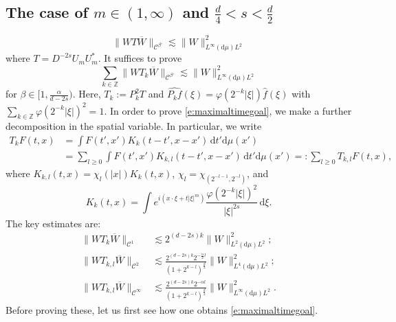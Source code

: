 \documentclass[a4paper]{amsart}
\numberwithin{equation}{section}%
\theoremstyle{plain}%
\theoremstyle{definition}
\theoremstyle{remark}%
\def\d{\mathrm{d}}
\def\C{\mathcal{C}}
\def\C{\mathcal{C}}
\begin{document}
\subsection*{The case of $m\in(1,\infty)$ and $\frac d4<s<\frac d2$}
\begin{equation}\label{e:goal maximal}
\|WT\overline{W}\|_{\C^{\beta'}}
\lesssim
\|W\|_{L^\infty(\d\mu)L^2}^2
\end{equation}
where $T=D^{-2s}U_mU_m^*$. It suffices to prove 
\begin{equation} \label{e:maximaltimegoal}
\sum_{k\in\mathbb Z} \|WT_k\overline{W} \|_{\C^{\beta'}}
\lesssim
\|W\|_{L^\infty(\d\mu)L^2}^2
\end{equation}
for $\beta\in[1,\frac{\alpha}{d-2s})$. Here, $T_k:=P_k^2T$ and $\widehat{P_k f}(\xi) = \varphi(2^{-k}|\xi|)\widehat{f}(\xi)$ with $\sum_{k\in\mathbb Z}\varphi(2^{-k}|\xi|)^2=1$. In order to prove \eqref{e:maximaltimegoal}, we make a further decomposition in the spatial variable. In particular, we write
\begin{align*}
T_k F(t,x)
&=
\int F(t',x') K_k(t-t',x-x')\,\d t' \d\mu(x')\\
&=
\sum_{l\geq0}\int F(t',x') K_{k,l}(t-t',x-x')\,\d t' \d\mu(x')
=:
\sum_{l\geq0}T_{k,l}F(t,x),
\end{align*}
where $K_{k,l}(t,x) = \chi_l(|x|)K_k(t,x)$, $\chi_l=\chi_{(2^{-l-1},2^{-l})}$, and 
\[
K_k(t,x)
=
\int e^{i(x\cdot\xi+t|\xi|^m)} \frac{\varphi(2^{-k}|\xi|)^2}{|\xi|^{2s}}\,\d\xi. 
\]
The key estimates are:
\begin{align}
\|WT_k\overline{W}\|_{\C^1} & \lesssim 2^{(d-2s)k}\|W\|_{L^2(\d\mu)L^2}^2 \label{e:C1k}; \\
\|WT_{k,l}\overline{W} \|_{\C^2} &\lesssim
\frac{2^{(d-2s)k}2^{-\frac{\alpha}{2}l}}{(1+2^{k-l })^\frac d2}\|W\|_{L^4(\d\mu)L^2}^2 \label{e:C2kl}; \\
\|WT_{k,l}\overline{W}\|_{\C^\infty}
& \lesssim
\frac{2^{(d-2s)k}2^{-\alpha l}}{(1+2^{k-l})^{\frac d2}}\|W\|_{L^\infty(\d\mu)L^2}^2. \label{e:Cinftykl}
\end{align} 
Before proving these, let us first see how one obtains \eqref{e:maximaltimegoal}.
\end{document}
